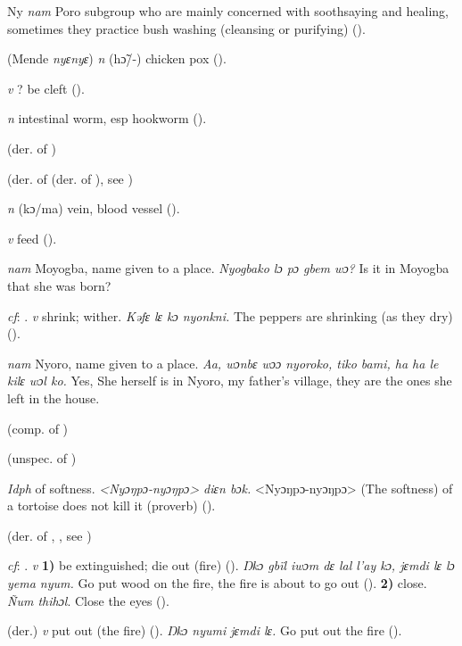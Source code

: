\begin{letter}{Ny}
 \textit{nam} Poro subgroup who are mainly concerned with soothsaying and healing, sometimes they practice bush washing (cleansing or purifying) (\citealt{Pichl1967}).

 (Mende \textit{nyɛnyɛ}) \textit{n} (hɔ̃/-) chicken pox (\citealt{Pichl1967}). 

 \textit{v} ? be cleft (\citealt{Pichl1967}).

 \textit{n} intestinal worm, esp hookworm (\citealt{Pichl1967}). 

 (der. of )

 (der. of  (der. of ), see ) 

 \textit{n} (kɔ/ma) vein, blood vessel (\citealt{Pichl1967}). 

 \textit{v} feed (\citealt{Pichl1967}).

 \textit{nam} Moyogba, name given to a place. \textit{Nyogbako lɔ pɔ gbem wɔ?} Is it in Moyogba that she was born?

 \textit{cf}: . \textit{v} shrink; wither. \textit{Kəfɛ lɛ kɔ nyonkni.} The peppers are shrinking (as they dry) (\citealt{Pichl1967}).

 \textit{nam} Nyoro, name given to a place. \textit{Aa, wɔnbɛ wɔɔ nyoroko, tiko bami, ha ha le kilɛ wɔl ko.} Yes, She herself is in Nyoro, my father's village, they are the ones she left in the house.

 (comp. of ) 

 (unspec. of ) 

 \textit{Idph} of softness. \textit{<Nyɔŋpɔ-nyɔŋpɔ> diɛn bɔk.} <Nyɔŋpɔ-nyɔŋpɔ> (The softness) of a tortoise does not kill it (proverb) (\citealt{TISLL1979}).

 (der. of , , see ) 

 \textit{cf}: . \textit{v} \textbf{1)} be extinguished; die out (fire) (\citealt{Pichl1967}). \textit{Ŋkɔ gbïl iwɔm dɛ lal l'ay kɔ, jɛmdi lɛ lɔ yema nyum.} Go put wood on the fire, the fire is about to go out (\citealt{Pichl1967}). \textbf{2)} close. \textit{Ñum thihɔl}. Close the eyes (\citealt{Pichl1967}). 

 (der.) \textit{v} put out (the fire) (\citealt{Pichl1967}). \textit{Ŋkɔ nyumi jɛmdi lɛ.} Go put out the fire (\citealt{Pichl1967}). 


\end{letter}

